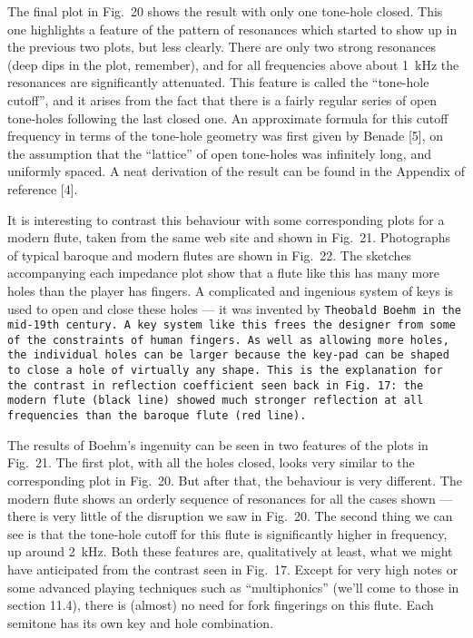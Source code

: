   The final plot in Fig.\ 20 shows the result with only one tone-hole closed. 
  This one highlights a feature of the pattern of resonances which started to 
  show up in the previous two plots, but less clearly. There are only two 
  strong resonances (deep dips in the plot, remember), and for all frequencies 
  above about 1~kHz the resonances are significantly attenuated. This feature 
  is called the “tone-hole cutoff”, and it arises from the fact that there is a 
  fairly regular series of open tone-holes following the last closed one. An 
  approximate formula for this cutoff frequency in terms of the tone-hole 
  geometry was first given by Benade [5], on the assumption that the “lattice” 
  of open tone-holes was infinitely long, and uniformly spaced. A neat 
  derivation of the result can be found in the Appendix of reference [4]. 

  It is interesting to contrast this behaviour with some corresponding plots 
  for a modern flute, taken from the same web site and shown in Fig.\ 21. 
  Photographs of typical baroque and modern flutes are shown in Fig.\ 22. The 
  sketches accompanying each impedance plot show that a flute like this has 
  many more holes than the player has fingers. A complicated and ingenious 
  system of keys is used to open and close these holes — it was invented by 
  \tt{}Theobald Boehm\rm{} in the mid-19th century. A key system like this 
  frees the designer from some of the constraints of human fingers. As well as 
  allowing more holes, the individual holes can be larger because the key-pad 
  can be shaped to close a hole of virtually any shape. This is the explanation 
  for the contrast in reflection coefficient seen back in Fig.\ 17: the modern 
  flute (black line) showed much stronger reflection at all frequencies than 
  the baroque flute (red line). 

  The results of Boehm’s ingenuity can be seen in two features of the plots in 
  Fig.\ 21. The first plot, with all the holes closed, looks very similar to 
  the corresponding plot in Fig.\ 20. But after that, the behaviour is very 
  different. The modern flute shows an orderly sequence of resonances for all 
  the cases shown — there is very little of the disruption we saw in Fig.\ 20. 
  The second thing we can see is that the tone-hole cutoff for this flute is 
  significantly higher in frequency, up around 2~kHz. Both these features are, 
  qualitatively at least, what we might have anticipated from the contrast seen 
  in Fig.\ 17. Except for very high notes or some advanced playing techniques 
  such as “multiphonics” (we’ll come to those in section 11.4), there is 
  (almost) no need for fork fingerings on this flute. Each semitone has its own 
  key and hole combination. 

